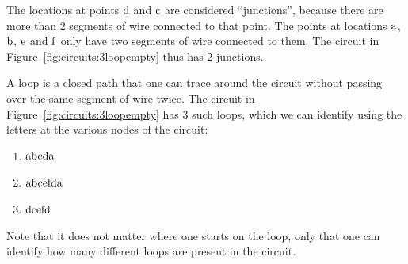 The locations at points ${\rm d}$ and ${\rm c}$ are considered ``junctions'', because there are more than 2 segments of wire connected to that point. The points at locations ${\rm a}$, ${\rm b}$, ${\rm e}$ and ${\rm f}$ only have two segments of wire connected to them. The circuit in Figure~\ref{fig:circuits:3loopempty} thus has 2 junctions.

A loop is a closed path that one can trace around the circuit without passing over the same segment of wire twice. The circuit in Figure~\ref{fig:circuits:3loopempty} has 3 such loops, which we can identify using the letters at the various nodes of the circuit:

\begin{enumerate}
\item ${\rm abcda}$
\item ${\rm abcefda}$
\item ${\rm dcefd}$
\end{enumerate}

Note that it does not matter where one starts on the loop, only that one can identify how many different loops are present in the circuit.


